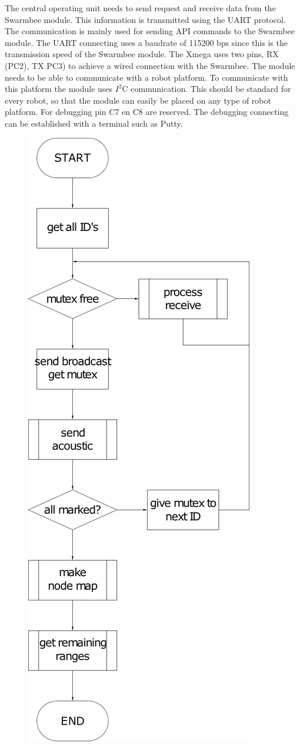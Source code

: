\documentclass[10pt,a4paper]{article}
\begin{document}
The central operating unit needs to send request and receive data from the Swarmbee module. This information is transmitted using the UART protocol. The communication is mainly used for sending API commands to the Swarmbee module. The UART connecting uses a baudrate of 115200 bps since this is the transmission speed of the Swarmbee module. The Xmega uses two pins, RX (PC2), TX PC3) to achieve a wired connection with the Swarmbee. The module needs to be able to communicate with a robot platform. To communicate with this platform the module uses $I^2$C communication. This should be standard for every robot, so that the module can easily be placed on any type of robot platform.
For debugging pin C7 en C8 are reserved. The debugging connecting can be established with a terminal such as Putty.

\begin{figure}[H]
   \centering
   \includegraphics[scale=0.45]{mainal.pdf}

\end{figure}
\end{document}
